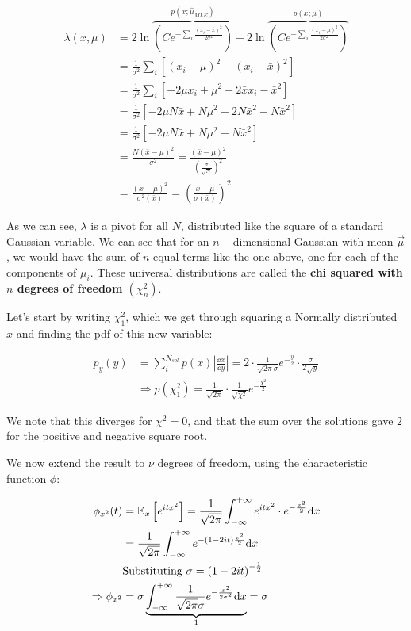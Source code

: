 	\begin{align*}
		\lambda(x,\mu) &= 2\ln\overbrace{\left(Ce^{-\sum_i\frac{(x_i-\bar{x})^2}{2\sigma^2}}\right)}^{p(x;\hat{\mu}_{MLE})} - 2\ln\overbrace{\left(C e^{-\sum_i \frac{(x_i-\mu)^2}{2\sigma^2}}\right)}^{p(x;\mu)}\\
		&= \frac{1}{\sigma^2}\sum_i\left[(x_i-\mu)^2-(x_i-\bar{x})^2\right] \\
		&= \frac{1}{\sigma^2}\sum_i\left[-2\mu x_i + \mu^2 +2\bar{x}x_i -\bar{x}^2\right] \\
		&= \frac{1}{\sigma^2}\left[-2\mu N\bar{x} + N\mu^2 +2N\bar{x}^2 -N\bar{x}^2\right] \\
		&= \frac{1}{\sigma^2}\left[-2\mu N\bar{x} + N\mu^2 +N\bar{x}^2\right]\\
		&= \frac{N\left(\bar{x} -\mu\right)^2}{\sigma^2} = \frac{\left(\bar{x}-\mu\right)^2}{\left(\frac{\sigma}{\sqrt{N}}\right)^2} \\
		&= \frac{\left(\bar{x} - \mu \right)^2}{\sigma^2(\bar{x})} = \left(\frac{\bar{x}-\mu}{\sigma(\bar{x})}\right)^2
	\end{align*}
	
As we can see, $\lambda$ is a pivot for all $N$, distributed like the square of a standard Gaussian variable. We can see that for an $n-$dimensional Gaussian with mean $\vec{\mu}$, we would have the sum of $n$ equal terms like the one above, one for each of the components of $\mu_i$. These universal distributions are called the \textbf{chi squared with $n$ degrees of freedom $\left(\chi^2_n\right)$}.
	
Let's start by writing $\chi^2_1$, which we get through squaring a Normally distributed $x$ and finding the pdf of this new variable:
	
	\begin{align*}
		p_y(y) &= \sum_i^{N_{sol}} p(x) \left|\frac{\dd x}{\dd y}\right| = 2\cdot\frac{1}{\sqrt{2\pi}\sigma}e^{-\frac{y}{2}}\cdot\frac{\sigma}{2\sqrt{y}}\\
		&\Rightarrow p(\chi_1^2) = \frac{1}{\sqrt{2\pi}} \cdot \frac{1}{\sqrt{\chi^2}}e^{-\frac{\chi^2}{2}}
	\end{align*} 
	
We note that this diverges for $\chi^2=0$, and that the sum over the solutions gave $2$ for the positive and negative square root. 
	
We now extend the result to $\nu$ degrees of freedom, using the characteristic function $\phi$:
	
	\begin{align*}
		\phi_{x^2}(t) &= \mathbb{E}_x\left[e^{itx^2}\right] = \frac{1}{\sqrt{2\pi}}\int_{-\infty}^{+\infty}e^{itx^2}\cdot e^{-\frac{x^2}{2}}\mathrm{d} x\\
		&= \frac{1}{\sqrt{2\pi}}\int_{-\infty}^{+\infty}e^{-\left(1-2it\right)\frac{x^2}{2}}\mathrm{d} x \\
		&\text{Substituting } \sigma= \left(1-2it\right)^{-\frac{1}{2}}\\
		\Rightarrow \phi_{x^2} &=\sigma\underbrace{\int_{-\infty}^{+\infty}\frac{1}{\sqrt{2\pi}\sigma}e^{-\frac{x^2}{2\sigma^2}}\mathrm{d} x}_{1} = \sigma
	\end{align*}
	
